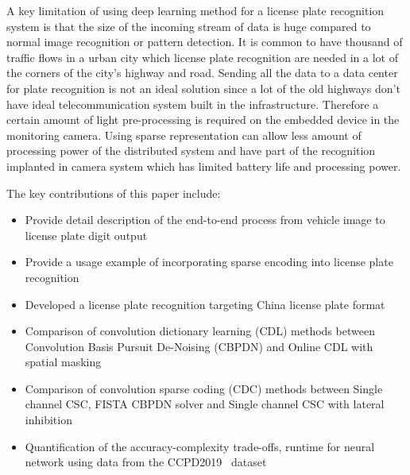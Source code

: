 A key limitation of using deep learning method for a license plate recognition system
is that the size of the incoming stream of data is huge compared to normal image recognition
or pattern detection. It is common to have thousand of traffic flows in a urban city 
which license plate recognition are needed in a lot of the corners of the city's highway
and road. Sending all the data to a data center for plate recognition is not an ideal
solution since a lot of the old highways don't have ideal telecommunication system built
in the infrastructure. Therefore a certain amount of light pre-processing is required 
on the embedded device in the monitoring camera. Using sparse representation can 
allow less amount of processing power of the distributed system and have part of the 
recognition implanted in camera system which has limited battery life and processing power.

The key contributions of this paper include:
\begin{itemize}
	\item Provide detail description of the end-to-end process from vehicle image
	to license plate digit output
	\item Provide a usage example of incorporating sparse encoding into license
	plate recognition
	\item Developed a license plate recognition targeting China license plate 
	format 
	\item Comparison of convolution dictionary learning (CDL) methods between 
	Convolution Basis Pursuit De-Noising (CBPDN)\cite{CDLreview2018} and Online 
	CDL with spatial masking\cite{onlineCDL}
	\item Comparison of convolution sparse coding (CDC) methods between 
	Single channel CSC\cite{CDLreview2018}, FISTA CBPDN solver\cite{SOREL201644} and Single channel CSC with 
	lateral inhibition\cite{CDLreview2018}
	\item Quantification of the accuracy-complexity trade-offs, runtime
	for neural network using data from the CCPD2019~\cite{xu2018towards} dataset
\end{itemize}

